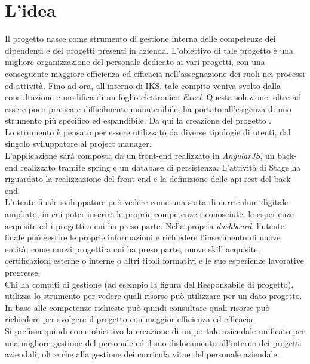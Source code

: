 
\section{L'idea}

Il progetto \myTitle{} nasce come strumento di gestione interna delle competenze dei dipendenti e dei progetti presenti in azienda. L'obiettivo di tale progetto è una migliore organizzazione del personale dedicato ai vari progetti, con una conseguente maggiore efficienza ed efficacia nell'assegnazione dei ruoli nei processi ed attività. Fino ad ora, all'interno di IKS, tale compito veniva svolto dalla consultazione e modifica di un foglio elettronico \emph{Excel}. Questa soluzione, oltre ad essere poco pratica e difficilmente manutenibile, ha portato all'esigenza di uno strumento più specifico ed espandibile. Da qui la creazione del progetto \myTitle{}.\\
Lo strumento \myTitle{} è pensato per essere utilizzato da diverse tipologie di utenti, dal singolo sviluppatore al project manager.\\
L'applicazione sarà composta da un \gls{front-end} realizzato in \emph{AngularJS}, un \gls{back-end} realizzato tramite \gls{spring} e un database di persistenza. L'attività di Stage ha riguardato la realizzazione del \gls{front-end} e la definizione delle \gls{api} \gls{rest} del \gls{back-end}.\\
L'utente finale sviluppatore può vedere \myTitle{} come una sorta di curriculum digitale ampliato, in cui poter inserire le proprie competenze riconosciute, le esperienze acquisite ed i progetti a cui ha preso parte. Nella propria \emph{dashboard}, l'utente finale può gestire le proprie informazioni e richiedere l'inserimento di nuove entità, come nuovi progetti a cui ha preso parte, nuove skill acquisite, certificazioni esterne o interne o altri titoli formativi e le sue esperienze lavorative pregresse.\\ 
Chi ha compiti di gestione (ad esempio la figura del Responsabile di progetto), utilizza lo strumento per vedere quali risorse può utilizzare per un dato progetto. In base alle competenze richieste può quindi consultare quali risorse può richiedere per svolgere il progetto con maggior efficienza ed efficacia.\\ 
Si prefissa quindi come obiettivo la creazione di un portale aziendale unificato per una migliore gestione del personale ed il suo dislocamento all’interno dei progetti aziendali, oltre che alla gestione dei curricula vitae del personale aziendale.\\
